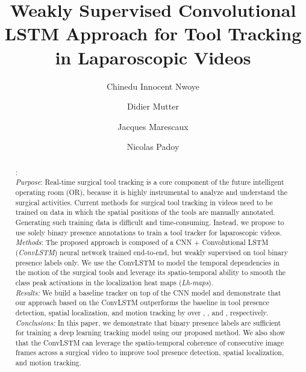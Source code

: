 \documentclass{svjour3}                     \smartqed
\begin{document}
\title{Weakly Supervised Convolutional LSTM Approach for Tool Tracking in Laparoscopic Videos}\subtitle{}
 \author{Chinedu Innocent Nwoye        \and
        Didier Mutter  \and
        Jacques Marescaux  \and
        Nicolas Padoy
}
\date{
} 

\maketitle

\begin{abstract}:\\ 
\emph{Purpose}: Real-time surgical tool tracking is a core component of the future intelligent operating room (OR), because it is highly instrumental to analyze and understand the surgical activities. 
Current methods for surgical tool tracking in videos need to be trained on data in which the spatial positions of the tools are manually annotated. Generating such training data is difficult and time-consuming. Instead, we propose to use solely binary presence annotations to train a tool tracker for laparoscopic videos.\\
\emph{Methods}: The proposed approach is composed of a CNN + Convolutional LSTM (\emph{ConvLSTM}) neural network trained end-to-end, but weakly supervised on tool binary presence labels only. 
We use the ConvLSTM to model the temporal dependencies in the motion of the surgical tools and leverage its spatio-temporal ability to smooth the class peak activations in the localization heat maps (\emph{Lh-maps}).\\ 
\emph{Results:} We build a baseline tracker on top of the CNN model and demonstrate that our approach based on the ConvLSTM outperforms the baseline in tool presence detection, spatial localization, and motion tracking by over , , and , respectively.\\ 
\emph{Conclusions:} In this paper, we demonstrate that binary presence labels are sufficient for training a deep learning tracking model using our proposed method. We also show that the ConvLSTM can leverage the spatio-temporal coherence of consecutive image frames across a surgical video to improve tool presence detection, spatial localization, and motion tracking.
\end{abstract}
\end{document}
